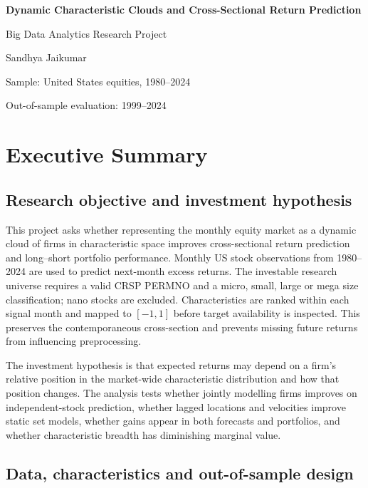 \documentclass[11pt,a4paper]{article}
\begin{document}
\begin{titlepage}
\centering
\vspace*{2.5cm}
{\Huge\bfseries Dynamic Characteristic Clouds and Cross-Sectional Return Prediction\par}
\vspace{0.8cm}
{\Large Big Data Analytics Research Project\par}
\vspace{1.5cm}
{\large Sandhya Jaikumar\par}
\vfill
{\large Sample: United States equities, 1980--2024\par}
{\large Out-of-sample evaluation: 1999--2024\par}
\vspace{1.5cm}
\end{titlepage}

\section*{Executive Summary}

\subsection*{Research objective and investment hypothesis}

This project asks whether representing the monthly equity market as a dynamic cloud of firms in characteristic space improves cross-sectional return prediction and long--short portfolio performance. Monthly US stock observations from 1980--2024 are used to predict next-month excess returns. The investable research universe requires a valid CRSP PERMNO and a micro, small, large or mega size classification; nano stocks are excluded. Characteristics are ranked within each signal month and mapped to $[-1,1]$ before target availability is inspected. This preserves the contemporaneous cross-section and prevents missing future returns from influencing preprocessing.

The investment hypothesis is that expected returns may depend on a firm's relative position in the market-wide characteristic distribution and how that position changes. The analysis tests whether jointly modelling firms improves on independent-stock prediction, whether lagged locations and velocities improve static set models, whether gains appear in both forecasts and portfolios, and whether characteristic breadth has diminishing marginal value.

\subsection*{Data, characteristics and out-of-sample design}
\end{document}
